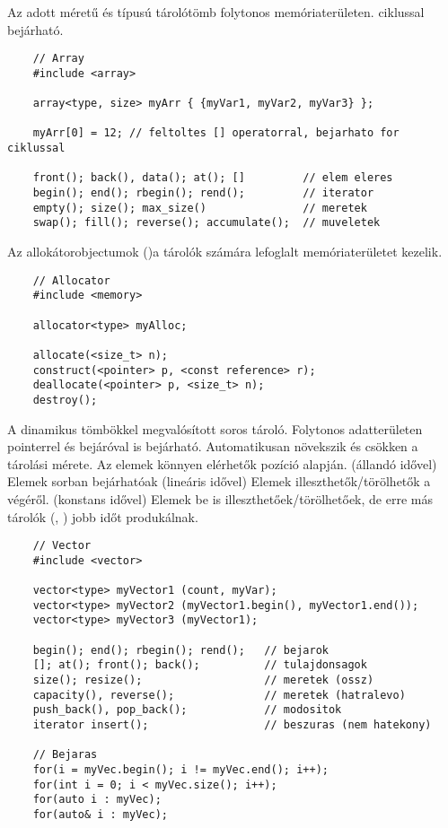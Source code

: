 \documentclass[main.tex]{subfiles}
\begin{document}
  
  Az  adott méretű és típusú tárolótömb
  folytonos memóriaterületen.  ciklussal bejárható.
  \begin{lstlisting}
    // Array
    #include <array>

    array<type, size> myArr { {myVar1, myVar2, myVar3} };

    myArr[0] = 12; // feltoltes [] operatorral, bejarhato for ciklussal

    front(); back(), data(); at(); []         // elem eleres
    begin(); end(); rbegin(); rend();         // iterator
    empty(); size(); max_size()               // meretek
    swap(); fill(); reverse(); accumulate();  // muveletek
  \end{lstlisting}

  Az allokátorobjectumok ()a tárolók számára
  lefoglalt memóriaterületet kezelik.
  \begin{lstlisting}
    // Allocator
    #include <memory>

    allocator<type> myAlloc;

    allocate(<size_t> n);
    construct(<pointer> p, <const reference> r);
    deallocate(<pointer> p, <size_t> n);
    destroy();
  \end{lstlisting}

  A  dinamikus tömbökkel megvalósított soros tároló.
  Folytonos adatterületen pointerrel és bejáróval is bejárható.
  Automatikusan növekszik és csökken a tárolási mérete.
  Az elemek könnyen elérhetők pozíció alapján. (állandó idővel)
  Elemek sorban bejárhatóak (lineáris idővel)
  Elemek illeszthetők/törölhetők a végéről. (konstans idővel)
  Elemek be is illeszthetőek/törölhetőek, de erre más tárolók
  (, ) jobb időt produkálnak.
  \begin{lstlisting}
    // Vector
    #include <vector>

    vector<type> myVector1 (count, myVar);
    vector<type> myVector2 (myVector1.begin(), myVector1.end());
    vector<type> myVector3 (myVector1);

    begin(); end(); rbegin(); rend();   // bejarok
    []; at(); front(); back();          // tulajdonsagok
    size(); resize();                   // meretek (ossz)
    capacity(), reverse();              // meretek (hatralevo)
    push_back(), pop_back();            // modositok
    iterator insert();                  // beszuras (nem hatekony)

    // Bejaras
    for(i = myVec.begin(); i != myVec.end(); i++);
    for(int i = 0; i < myVec.size(); i++);
    for(auto i : myVec);
    for(auto& i : myVec);
  \end{lstlisting}
\end{document}
